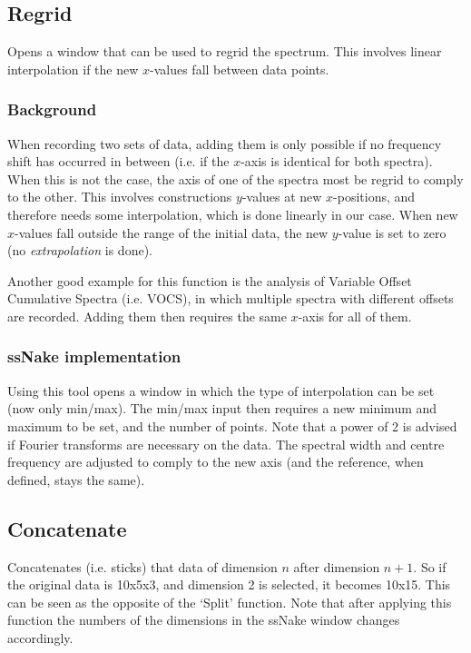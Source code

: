 \documentclass[11pt,a4paper]{article}
\begin{document}
\subsection{Regrid}
Opens a window that can be used to regrid the spectrum. This involves linear interpolation if the new
$x$-values fall between data points.

\subsubsection*{Background}
When recording two sets of data, adding them is only possible if no frequency shift has occurred in between
(i.e. if the $x$-axis is identical for both spectra). When this is not the case, the axis of one of the
spectra most be regrid to comply to the other. This involves constructions $y$-values at new $x$-positions, and
therefore needs some interpolation, which is done linearly in our case. When new $x$-values fall outside the
range of the initial data, the new $y$-value is set to zero (no \textit{extrapolation} is done).

Another good example for this function is the analysis of Variable Offset Cumulative Spectra (i.e. VOCS), in
which multiple spectra with different offsets are recorded. Adding them then requires the same $x$-axis for
all of them.

\subsubsection*{ssNake implementation}
Using this tool opens a window in which the type of interpolation can be set (now only min/max). The min/max
input then requires a new minimum and maximum to be set, and the number of points. Note that a power of 2 is
advised if Fourier transforms are necessary on the data. The spectral width and centre frequency are adjusted
to comply to the new axis (and the reference, when defined, stays the same).

\subsection{Concatenate}
Concatenates (i.e. sticks) that data of dimension $n$ after dimension $n+1$. So if the original data is 10x5x3, and dimension 2 is selected,
it becomes 10x15. This can be seen as the opposite of the `Split' function. Note that after applying this function the numbers of the dimensions in the ssNake window changes accordingly.
\end{document}
